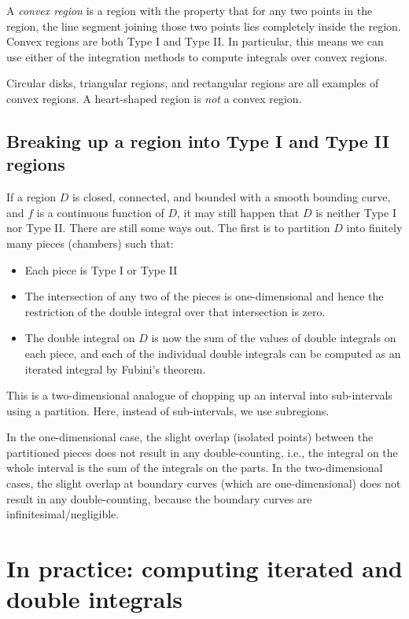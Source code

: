 \documentclass[10pt]{amsart}
\begin{document}
A {\em convex region} is a region with the property that for any two
points in the region, the line segment joining those two points lies
completely inside the region. Convex regions are both Type I and Type
II. In particular, this means we can use either of the integration
methods to compute integrals over convex regions.

Circular disks, triangular regions, and rectangular regions are all
examples of convex regions. A heart-shaped region is {\em not} a
convex region.

\subsection{Breaking up a region into Type I and Type II regions}

If a region $D$ is closed, connected, and bounded with a smooth
bounding curve, and $f$ is a continuous function of $D$, it may still
happen that $D$ is neither Type I nor Type II. There are still some
ways out. The first is to partition $D$ into finitely many pieces (chambers) such
that:

\begin{itemize}
\item Each piece is Type I or Type II
\item The intersection of any two of the pieces is one-dimensional and
  hence the restriction of the double integral over that intersection
  is zero.
\item The double integral on $D$ is now the sum of the values of
  double integrals on each piece, and each of the individual double
  integrals can be computed as an iterated integral by Fubini's
  theorem.
\end{itemize}

This is a two-dimensional analogue of chopping up an interval into
sub-intervals using a partition. Here, instead of sub-intervals, we
use subregions.

In the one-dimensional case, the slight overlap (isolated points)
between the partitioned pieces does not result in any double-counting,
i.e., the integral on the whole interval is the sum of the integrals
on the parts. In the two-dimensional cases, the slight overlap at
boundary curves (which are one-dimensional) does not result in any
double-counting, because the boundary curves are
infinitesimal/negligible.

\section{In practice: computing iterated and double integrals}
\end{document}
